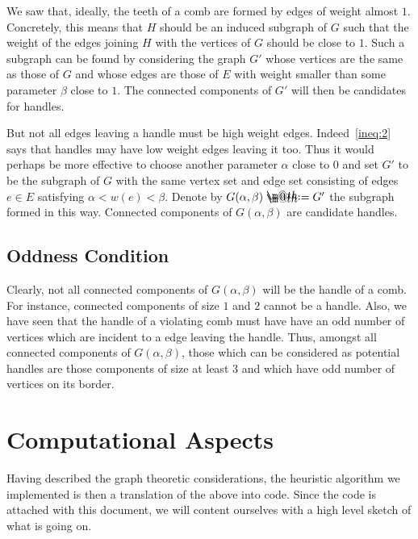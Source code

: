 \documentclass[11pt, letterpaper]{amsart}
\makeatletter
\theoremstyle{plain}
\theoremstyle{definition}
\theoremstyle{remark}
\newcommand*{\coloneqq}{\mathrel{\rlap{%
           \raisebox{0.3ex}{$\m@th\cdot$}}%
           \raisebox{-0.3ex}{$\m@th\cdot$}}%
           =}
\makeatother
\begin{document}
We saw that, ideally, the teeth of a comb are formed by edges of weight almost
$1$. Concretely, this means that $H$ should be an induced subgraph of $G$ such
that the weight of the edges joining $H$ with the vertices of $G$ should be
close to $1$. Such a subgraph can be found by considering the graph $G'$ whose
vertices are the same as those of $G$ and whose edges are those of $E$ with
weight smaller than some parameter $\beta$ close to $1$. The connected
components of $G'$ will then be candidates for handles.

But not all edges leaving a handle must be high weight edges.
Indeed~\eqref{ineq:2} says that handles may have low weight edges leaving it
too. Thus it would perhaps be more effective to choose another parameter
$\alpha$ close to $0$ and set $G'$ to be the subgraph of $G$ with the same
vertex set and edge set consisting of edges $e \in E$ satisfying $\alpha < w(e)
< \beta$. Denote by $G(\alpha,\beta) \coloneqq G'$ the subgraph formed in this
way. Connected components of $G(\alpha,\beta)$ are candidate handles.

\subsection{Oddness Condition}
Clearly, not all connected components of $G(\alpha,\beta)$ will be the handle
of a comb. For instance, connected components of size $1$ and $2$ cannot be a
handle. Also, we have seen that the handle of a violating comb must have have
an odd number of vertices which are incident to a edge leaving the handle.
Thus, amongst all connected components of $G(\alpha,\beta)$, those which can be
considered as potential handles are those components of size at least $3$ and
which have odd number of vertices on its border.

\section{Computational Aspects}\label{sec:algo}
Having described the graph theoretic considerations, the heuristic algorithm we
implemented is then a translation of the above into code. Since the code is attached
with this document, we will content ourselves with a high level sketch of what is
going on.
\end{document}
